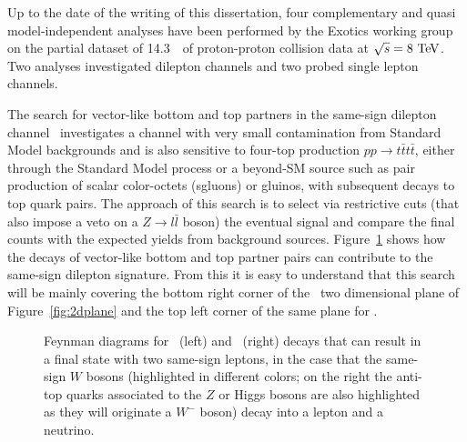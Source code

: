 Up to the date of the writing of this dissertation, four complementary 
and quasi model-independent analyses have been performed by the Exotics working
group on the partial dataset of 14.3~\ifb\ of proton-proton collision data at 
$\sqrt{s}=8\tev$.  
Two analyses investigated dilepton channels and two probed single lepton channels.

The search for vector-like bottom and top partners in the same-sign 
dilepton channel~\cite{ATLAS-CONF-2013-051}
investigates a channel
with very small contamination from Standard Model backgrounds and
is also sensitive to four-top production $pp\to t\bar{t}t\bar{t}$, 
either through the Standard Model process or a beyond-SM source such as 
pair production of scalar color-octets (sgluons) or gluinos, with subsequent 
decays to top quark pairs.
The approach of this search is to select via restrictive cuts (that also
impose a veto on a $Z\to l\bar{l}$ boson) the eventual signal
and compare the final counts with the expected yields from background sources.
Figure~\ref{fig:feyndSS} shows how the decays of vector-like bottom and top partner
pairs can contribute to the same-sign dilepton signature. From this it is easy to
understand that this search will be mainly covering the bottom right corner
of the \BBbar\ two dimensional plane of Figure~\ref{fig:2dplane} and the top 
left corner of the same plane for \TTbar.

\begin{figure}[hbt]
\begin{center}
        \myskip\myskip
	\caption{Feynman diagrams for \BBbar\ (left) and \TTbar\ (right)
        decays that can result in a final state with two same-sign leptons,
        in the case that the same-sign $W$ bosons (highlighted in different colors;
        on the right the anti-top quarks associated to the $Z$ or Higgs bosons are
        also highlighted as they will originate a $W^{-}$ boson) decay
        into a lepton and a neutrino. \label{fig:feyndSS}}
\end{center}
\end{figure}


